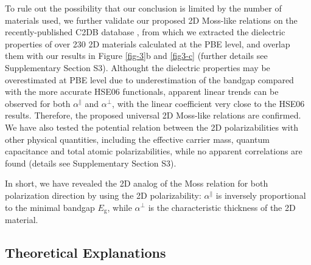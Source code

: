 \documentclass[journal=ancac3,manuscript=article,email=true,hyperref=true,keywords=false]{achemso}
\begin{document}
To rule out the possibility that our conclusion is limited by the
number of materials used, we further validate our proposed 2D
Moss-like relations on the recently-published C2DB database
\cite{Haastrup_2018}, from which we extracted the dielectric
properties of over 230 2D materials calculated at the PBE level, and
overlap them with our results in Figure \ref{fig-3}b and \ref{fig3-c}
(further details see Supplementary Section S3). Althought the
dielectric properties may be overestimated at PBE level due to
underestimation of the bandgap compared with the more accurate HSE06
functionals, apparent linear trends can be observed for both
$\alpha^{\parallel}$ and $\alpha^{\perp}$, with the linear coefficient
very close to the HSE06 results. Therefore, the proposed universal 2D
Moss-like relations are confirmed.  We have also tested the potential
relation between the 2D polarizabilities with other physical
quantities, including the effective carrier mass, quantum capacitance
and total atomic polarizabilities, while no apparent correlations are
found (details see Supplementary Section S3). 

In short, we have revealed the 2D analog of the Moss relation for both
polarization direction by using the 2D polarizability: $\alpha^{\parallel}$ is inversely proportional
to the minimal bandgap $E_{\mathrm{g}}$, while $\alpha^{\perp}$ is the
characteristic thickness of the 2D material. 


\iffalse
\subsection{Theoretical Explanations}
\label{sec:theory}
\end{document}
